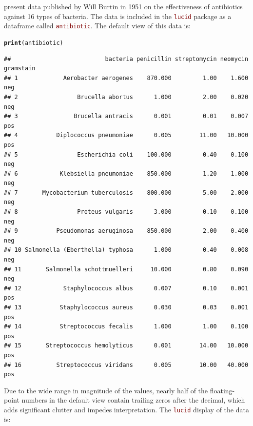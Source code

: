 \documentclass[12pt]{article}\usepackage[]{graphicx}\usepackage[]{color}
\makeatletter
\newcommand{\hlstd}[1]{\textcolor[rgb]{0.345,0.345,0.345}{#1}}%
\newcommand{\hlkwd}[1]{\textcolor[rgb]{0.737,0.353,0.396}{\textbf{#1}}}%
\newenvironment{kframe}{%
 \def\at@end@of@kframe{}%
 \ifinner\ifhmode%
  \def\at@end@of@kframe{\end{minipage}}%
  \begin{minipage}{\columnwidth}%
 \fi\fi%
 \def\FrameCommand##1{\hskip\@totalleftmargin \hskip-\fboxsep
 \colorbox{shadecolor}{##1}\hskip-\fboxsep
     \hskip-\linewidth \hskip-\@totalleftmargin \hskip\columnwidth}%
 \MakeFramed {\advance\hsize-\width
   \@totalleftmargin\z@ \linewidth\hsize
   \@setminipage}}%
 {\par\unskip\endMakeFramed%
 \at@end@of@kframe}
\newenvironment{knitrout}{}{} %
\newcommand{\code}[1]{\texttt{\textcolor{maroon}{#1}}}
\makeatother
\begin{document}
\cite{wainer2009pictures} present data published by Will Burtin in 1951
on the effectiveness of antibiotics against 16 types of bacteria.
The data is included in the \code{lucid} package as a dataframe
called \code{antibiotic}.  The default view of this data is:
\begin{knitrout}
\color{fgcolor}\begin{kframe}
\begin{alltt}
\hlkwd{print}\hlstd{(antibiotic)}
\end{alltt}
\begin{verbatim}
##                           bacteria penicillin streptomycin neomycin gramstain
## 1             Aerobacter aerogenes    870.000         1.00    1.600       neg
## 2                 Brucella abortus      1.000         2.00    0.020       neg
## 3                Brucella antracis      0.001         0.01    0.007       pos
## 4           Diplococcus pneumoniae      0.005        11.00   10.000       pos
## 5                 Escherichia coli    100.000         0.40    0.100       neg
## 6            Klebsiella pneumoniae    850.000         1.20    1.000       neg
## 7       Mycobacterium tuberculosis    800.000         5.00    2.000       neg
## 8                 Proteus vulgaris      3.000         0.10    0.100       neg
## 9           Pseudomonas aeruginosa    850.000         2.00    0.400       neg
## 10 Salmonella (Eberthella) typhosa      1.000         0.40    0.008       neg
## 11       Salmonella schottmuelleri     10.000         0.80    0.090       neg
## 12            Staphylococcus albus      0.007         0.10    0.001       pos
## 13           Staphylococcus aureus      0.030         0.03    0.001       pos
## 14           Streptococcus fecalis      1.000         1.00    0.100       pos
## 15       Streptococcus hemolyticus      0.001        14.00   10.000       pos
## 16          Streptococcus viridans      0.005        10.00   40.000       pos
\end{verbatim}
\end{kframe}
\end{knitrout}
Due to the wide range in magnitude of the values, nearly half of the
floating-point numbers in the default view contain trailing zeros
after the decimal, which adds significant clutter and impedes
interpretation.  The \code{lucid} display of the data is:
\end{document}
